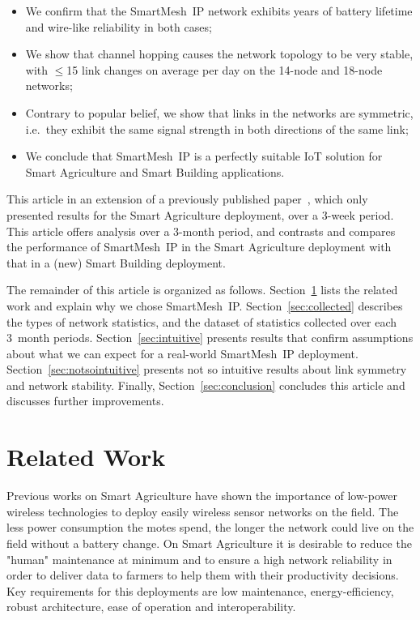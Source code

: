 \documentclass{elsarticle}
\newcommand{\smip}                {SmartMesh~IP\xspace}
\newcommand{\building}            {Smart Building\xspace}
\newcommand{\agri}                {Smart Agriculture\xspace}
\begin{document}
\begin{itemize}
    \item We confirm that the \smip network exhibits years of battery lifetime and wire-like reliability in both cases;
    \item We show that channel hopping causes the network topology to be very stable, with $\leq$15 link changes on average per day on the 14-node and 18-node networks;
    \item Contrary to popular belief, we show that links in the networks are symmetric, i.e.~they exhibit the same signal strength in both directions of the same link;
    \item We conclude that \smip is a perfectly suitable IoT solution for \agri and \building applications.
\end{itemize}


This article in an extension of a previously published paper~\cite{brun16intuitive}, which only presented results for the \agri deployment, over a 3-week period.
This article offers analysis over a 3-month period, and contrasts and compares the performance of \smip in the \agri deployment with that in a (new) \building deployment.


The remainder of this article is organized as follows.
Section~\ref{sec:related} lists the related work and explain why we chose \smip.
Section~\ref{sec:collected} describes the types of network statistics, and the dataset of statistics collected over each 3~month periods.
Section~\ref{sec:intuitive} presents results that confirm assumptions about what we can expect for a real-world \smip deployment.
Section~\ref{sec:notsointuitive} presents not so intuitive results about link symmetry and network stability.
Finally, Section~\ref{sec:conclusion} concludes this article and discusses further improvements.

\section{Related Work}
\label{sec:related}

Previous works on \agri \cite{ojha2015wireless} have shown the importance of low-power wireless technologies to deploy easily wireless sensor networks on the field. The less power consumption the motes spend, the longer the network could live on the field without a battery change. On \agri it is desirable to reduce the "human" maintenance at minimum and to ensure a high network reliability in order to deliver data to farmers to help them with their productivity decisions. Key requirements for this deployments are low maintenance, energy-efficiency, robust architecture, ease of operation and interoperability.
\end{document}
